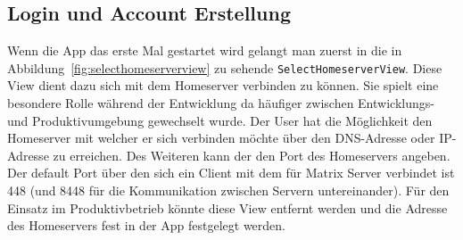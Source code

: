     \newpage
    \subsection{Login und Account Erstellung}

    Wenn die App das erste Mal gestartet wird gelangt man zuerst in die in Abbildung~\ref{fig:selecthomeserverview} zu sehende \texttt{SelectHomeserverView}.
    Diese View dient dazu sich mit dem Homeserver verbinden zu können.
    Sie spielt eine besondere Rolle während der Entwicklung da häufiger zwischen Entwicklungs- und Produktivumgebung gewechselt wurde.
    Der User hat die Möglichkeit den Homeserver mit welcher er sich verbinden möchte über den DNS-Adresse oder IP-Adresse zu erreichen.
    Des Weiteren kann der den Port des Homeservers angeben.
    Der default Port über den sich ein Client mit dem für Matrix Server verbindet ist 448 (und 8448 für die Kommunikation zwischen Servern untereinander).
    Für den Einsatz im Produktivbetrieb könnte diese View entfernt werden und die Adresse des Homeservers fest in der App festgelegt werden.

